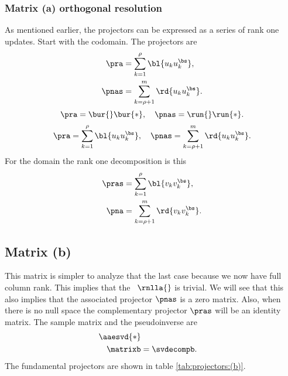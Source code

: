 \subsubsection{Matrix (a) orthogonal resolution}
As mentioned earlier, the projectors can be expressed as a series of rank one updates. Start with the codomain. The projectors are
\begin{equation}
  \begin{split}
    \pra  &= \sum_{k=1}^{\rho}   {\bl{ u_{k}u_{k}^{\bs} }}, \\
    \pnas &= \sum_{k=\rho+1}^{m} {\rd{ u_{k}u_{k}^{\bs} }}.
  \end{split}
\end{equation}
%
\begin{equation}
  \pra  = \bur{} \bur{*}, \quad 
  \pnas = \run{} \run{*}.
\end{equation}
%
\begin{equation}
  \pra  = \sum_{k=1}^{\rho}   {\bl{ u_{k}u_{k}^{\bs} }}, \quad 
  \pnas = \sum_{k=\rho+1}^{m} {\rd{ u_{k}u_{k}^{\bs} }}.
\end{equation}
%
For the domain the rank one decomposition is this
\begin{equation}
  \begin{split}
    \pras &= \sum_{k=1}^{\rho}   {\bl{ v_{k} v_{k}^{\bs} }}, \\
    \pna  &= \sum_{k=\rho+1}^{m} {\rd{ v_{k} v_{k}^{\bs} }}.
  \end{split}
\end{equation}



\subsection{Matrix (b)}
This matrix is simpler to analyze that the last case because we now have full column rank. This implies that the \ns \ $\rnlla{}$ is trivial. We will see that this also implies that the associated projector $\pnas$ is a zero matrix. Also, when there is no null space the complementary projector $\pras$ will be an identity matrix.
The sample matrix and the pseudoinverse are
\begin{equation*}
  \begin{split}
    \aaesvd{*} \\
    \matrixb &= \svdecompb.   
  \end{split}
\end{equation*}
The fundamental projectors are shown in table \eqref{tab:projectors:(b)}. 

